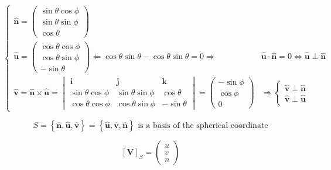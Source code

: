 \documentclass[
]{book}
\theoremstyle{definition}
\theoremstyle{definition}
\theoremstyle{definition}
\theoremstyle{definition}
\theoremstyle{remark}
\begin{document}
\[
\begin{cases}
\hat{\boldsymbol{n}}=\begin{pmatrix}\sin\theta\cos\phi\\
\sin\theta\sin\phi\\
\cos\theta
\end{pmatrix}\\
\hat{\boldsymbol{u}}=\begin{pmatrix}\cos\theta\cos\phi\\
\cos\theta\sin\phi\\
-\sin\theta
\end{pmatrix}\Leftarrow\cos\theta\sin\theta-\cos\theta\sin\theta=0\Rightarrow & \hat{\boldsymbol{u}}\cdot\hat{\boldsymbol{n}}=0\Leftrightarrow\hat{\boldsymbol{u}}\perp\hat{\boldsymbol{n}}\\
\hat{\boldsymbol{v}}=\hat{\boldsymbol{n}}\times\hat{\boldsymbol{u}}=\begin{vmatrix}\boldsymbol{i} & \boldsymbol{j} & \boldsymbol{k}\\
\sin\theta\cos\phi & \sin\theta\sin\phi & \cos\theta\\
\cos\theta\cos\phi & \cos\theta\sin\phi & -\sin\theta
\end{vmatrix}=\begin{pmatrix}-\sin\phi\\
\cos\phi\\
0
\end{pmatrix} & \Rightarrow\begin{cases}
\hat{\boldsymbol{v}}\perp\hat{\boldsymbol{n}}\\
\hat{\boldsymbol{v}}\perp\hat{\boldsymbol{u}}
\end{cases}
\end{cases}
\]

\[
S=\left\{ \hat{\boldsymbol{n}},\hat{\boldsymbol{u}},\hat{\boldsymbol{v}}\right\} =\left\{ \hat{\boldsymbol{u}},\hat{\boldsymbol{v}},\hat{\boldsymbol{n}}\right\} \text{ is a basis of the spherical coordinate}
\]

\[
\left[\boldsymbol{V}\right]_{S}=\begin{pmatrix}u\\
v\\
n
\end{pmatrix}
\]
\end{document}

